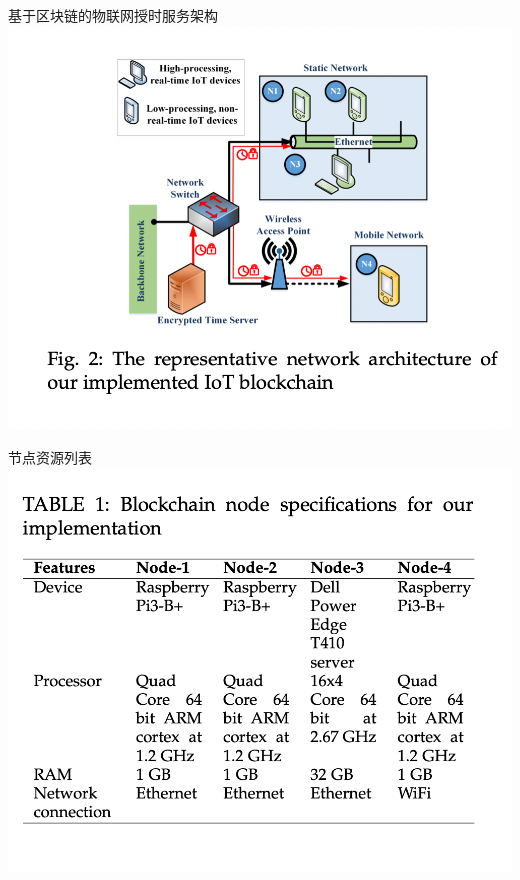 \documentclass{beamer}
\begin{document}
\begin{frame}{基于区块链的物联网授时服务架构}
	\includegraphics[width=\linewidth]{Assets/图2}
\end{frame}

\begin{frame}{节点资源列表}
	\includegraphics[width=\linewidth]{Assets/表1}
\end{frame}
\end{document}
